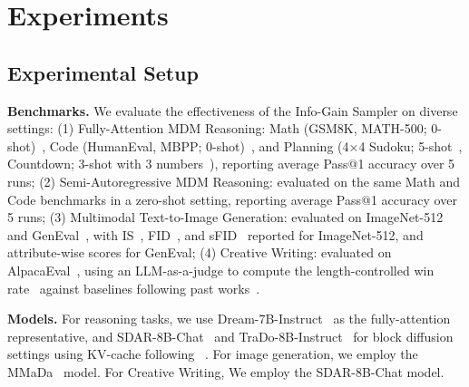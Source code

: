 \section{Experiments}
\subsection{Experimental Setup}
\label{sec:exp}
\noindent \textbf{Benchmarks.}
We evaluate the effectiveness of the Info-Gain Sampler on diverse settings:
(1) Fully-Attention MDM Reasoning:
Math (GSM8K, MATH-500; 0-shot)~\cite{cobbe2021gsm8k,hendrycksmath2021},
Code (HumanEval, MBPP; 0-shot)~\cite{chen2021evaluating,austin2021program},
and Planning (4$\times$4 Sudoku; 5-shot~\cite{qin2025backtrack}, Countdown; 3-shot with 3 numbers~\cite{ye2025dream}),
reporting average Pass@1 accuracy over 5 runs;
{(2) Semi-Autoregressive MDM Reasoning:}
evaluated on the same Math and Code benchmarks
in a zero-shot setting, reporting average Pass@1 accuracy over 5 runs;
{(3) Multimodal Text-to-Image Generation:}
evaluated on ImageNet-512 and GenEval~\cite{ghosh2023geneval},
with IS~\cite{salimans2016improved}, FID~\cite{heusel2017gans},
and sFID~\cite{radford2018improving,salimans2016improved} reported for ImageNet-512,
and attribute-wise scores for GenEval;
{(4) Creative Writing:}
evaluated on AlpacaEval~\cite{alpaca_eval}, using an LLM-as-a-judge to compute
the length-controlled win rate~\cite{dubois2024length} against baselines following past works~\cite{nguyen2024turning}.

\noindent\textbf{Models.} For reasoning tasks, we use Dream-7B-Instruct~\cite{ye2025dream} as the fully-attention representative, and {SDAR-8B-Chat}~\cite{cheng2025sdar} and {TraDo-8B-Instruct}~\cite{wang2025revolutionizingreinforcementlearningframework} for block diffusion settings using KV-cache following ~\cite{wu2025fast}. For image generation, we employ the {MMaDa}~\cite{yang2025mmada} model.
For Creative Writing, We employ the SDAR-8B-Chat model.

